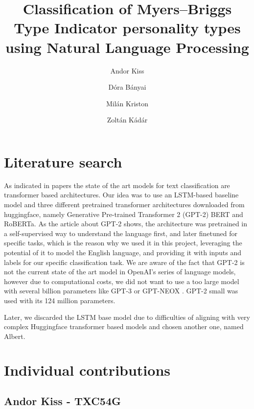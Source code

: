 \documentclass[runningheads]{llncs}
\begin{document}
%
\title{Classification of Myers–Briggs Type Indicator personality types using Natural Language Processing}
%
%
\author{Andor Kiss \and
Dóra Bányai \and
Milán Kriston \and
Zoltán Kádár}
%


\maketitle
\section{Literature search}

As indicated in papers \cite{DL_text_class} \cite{MBTI_class} the state of the art models for text classification are transformer based architectures. Our idea was to use an LSTM-based baseline model and three different pretrained transformer architectures downloaded from huggingface, namely Generative Pre-trained Transformer 2 (GPT-2) \cite{gpt2} BERT and RoBERTa. As the article about GPT-2 \cite{gpt2} shows, the architecture was pretrained in a self-supervised way to understand the language first, and later finetuned for specific tasks, which is the reason why we used it in this project, leveraging the potential of it to model the English language, and providing it with inputs and labels for our specific classification task. We are aware of the fact that GPT-2 is not the current state of the art model in OpenAI's series of language models, however due to computational costs, we did not want to use a too large model with several billion parameters like GPT-3 \cite{gpt-3} or GPT-NEOX \cite{gpt-neox}. GPT-2 small was used with its 124 million parameters.

Later, we discarded the LSTM base model due to difficulties of aligning with very complex Huggingface transformer based models and chosen another one, named Albert.

\section{Individual contributions}

\subsection{Andor Kiss - TXC54G}
\end{document}
